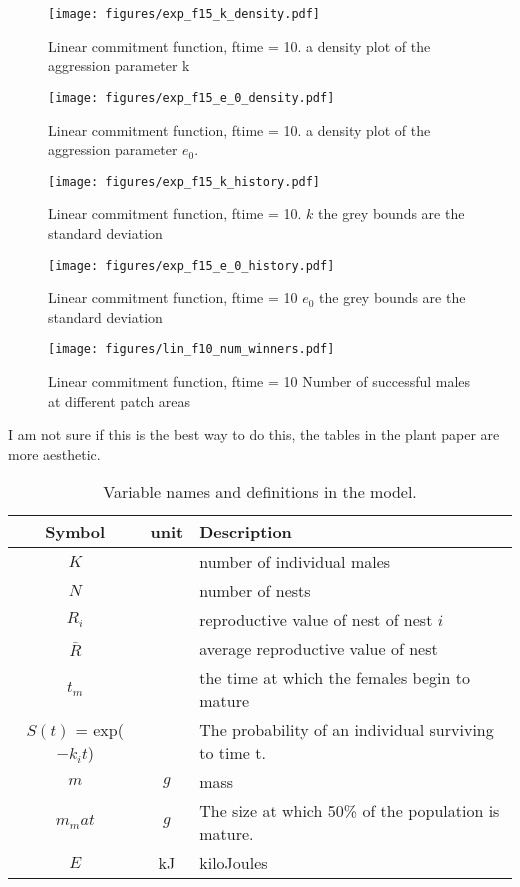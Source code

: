 \documentclass[a4paper,11pt]{article}
\begin{document}
\begin{figure}[h!]
    \centering
    \texttt{[image: figures/exp\_f15\_k\_density.pdf]}
    \caption{Linear commitment function, ftime = 10. a density plot of the aggression parameter k}
    \label{fig:k density}

    \texttt{[image: figures/exp\_f15\_e\_0\_density.pdf]}
    \caption{Linear commitment function, ftime = 10. a density plot of the aggression parameter $e_0$.}
    \label{fig:e_0 density}
\end{figure}

\begin{figure}[h!]
    \centering
    \texttt{[image: figures/exp\_f15\_k\_history.pdf]}
    \caption{Linear commitment function, ftime = 10. $k$ the grey bounds are the standard deviation}

    \texttt{[image: figures/exp\_f15\_e\_0\_history.pdf]}
    \caption{Linear commitment function, ftime = 10 $e_0$ the grey bounds are the standard deviation}
\end{figure}


\begin{figure}[h!]
    \centering
    \texttt{[image: figures/lin\_f10\_num\_winners.pdf]}
    \caption{Linear commitment function, ftime = 10 Number of successful males at different patch areas}
    \label{fig:num winners expf10}
\end{figure}


\clearpage


I am not sure if this is the best way to do this, the tables in the plant paper are more aesthetic.\\

\begin{table}[h!]
    \caption{Variable names and definitions in the model.}
    \centering
    \begin{tabular}{c | c | l }
        \hline
        Symbol & unit & Description\\
        \hline
        \hline
        $K$ & & number of individual males \\
        $N$ & & number of nests \\
        $R_i$ & & reproductive value of nest of nest $i$\\
        $\bar{R}$ & & average reproductive value of nest\\
        \hline
        $t_m$ & & the time at which the females begin to mature\\
        $S(t)$ = exp($-k_it$) & & The probability of an individual surviving to time t.\\
        \hline
        $m$ & $g$ & mass\\
        $m_mat$ & $g$ & The size at which 50\% of the population is mature.\\
        $E$ & kJ & kiloJoules\\
        \hline
    \end{tabular}
\end{table}
\end{document}
